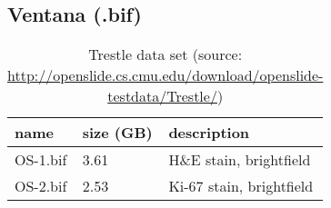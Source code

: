 \subsection{Ventana (.bif)}
\begin{table}[H]
	\begin{center}
		\begin{tabular}{| p{4cm} | p{2cm} | p{5cm} |}
			\hline
			\textbf{name} & \textbf{size (GB)} & \textbf{description} \\ \hline
			 OS-1.bif & 3.61 & H\&E stain, brightfield \\ \hline
			 OS-2.bif & 2.53 & Ki-67 stain, brightfield \\ \hline
 		\end{tabular}
		\caption{Trestle data set (source: \url{http://openslide.cs.cmu.edu/download/openslide-testdata/Trestle/})}
	\end{center}
\end{table}

